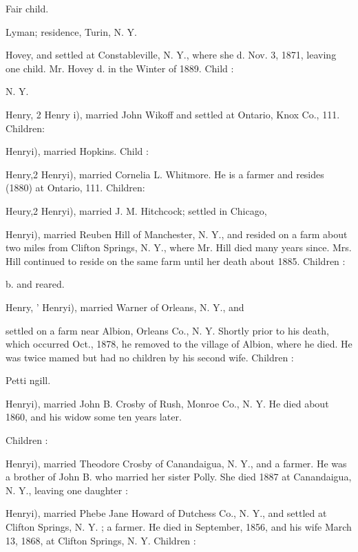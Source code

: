 \documentclass{book}
\begin{document}
Fair child. 


Lyman; residence, Turin, N. Y. 


Hovey, and settled at Constableville, N. Y., where she d. 
Nov. 3, 1871, leaving one child. Mr. Hovey d. in the Winter 
of 1889. Child : 

N. Y. 

Henry, 2 Henry i), married John Wikoff and settled at Ontario, 
Knox Co., 111. Children: 






Henryi), married Hopkins. Child : 


Henry,2 Henryi), married Cornelia L. Whitmore. He is a farmer 
and resides (1880) at Ontario, 111. Children: 





Heury,2 Henryi), married J. M. Hitchcock; settled in Chicago, 



Henryi), married Reuben Hill of Manchester, N. Y., and resided 
on a farm about two miles from Clifton Springs, N. Y., where 
Mr. Hill died many years since. Mrs. Hill continued to reside 
on the same farm until her death about 1885. Children : 




b. and reared. 


Henry, ' Henryi), married Warner of Orleans, N. Y., and 

settled on a farm near Albion, Orleans Co., N. Y. Shortly prior 
to his death, which occurred Oct., 1878, he removed to the 
village of Albion, where he died. He was twice mamed but had 
no children by his second wife. Children : 



Petti ngill. 

Henryi), married John B. Crosby of Rush, Monroe Co., N. Y. 
He died about 1860, and his widow some ten years later. 

Children : 




Henryi), married Theodore Crosby of Canandaigua, N. Y., and 
a farmer. He was a brother of John B. who married her sister 
Polly. She died 1887 at Canandaigua, N. Y., leaving one 
daughter : 


Henryi), married Phebe Jane Howard of Dutchess Co., N. Y., 
and settled at Clifton Springs, N. Y. ; a farmer. He died in 
September, 1856, and his wife March 13, 1868, at Clifton Springs, 
N. Y. Children : 
\end{document}
